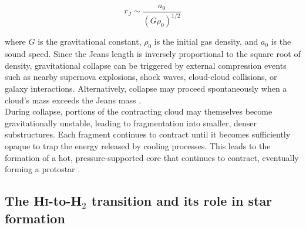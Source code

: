 \begin{equation}
    r_J \sim \frac{a_0}{(G\rho_0)^{1/2}}
\end{equation}

\noindent where $G$ is the gravitational constant, $\rho_0$ is the initial gas density, and $a_0$ is the sound speed. Since the Jeans length is inversely proportional to the square root of density, gravitational collapse can be triggered by external compression events such as nearby supernova explosions, shock waves, cloud-cloud collisions, or galaxy interactions. Alternatively, collapse may proceed spontaneously when a cloud's mass exceeds the Jeans mass \citep{Jeans1902, ISF2011}.\\\indent
During collapse, portions of the contracting cloud may themselves become gravitationally unstable, leading to fragmentation into smaller, denser substructures. Each fragment continues to contract until it becomes sufficiently opaque to trap the energy released by cooling processes. This leads to the formation of a hot, pressure-supported core that continues to contract, eventually forming a protostar \citep{ISF2011, Klessen2016}.

\subsection{The \textrm{H\textsc{i}}-to-H$_2$ transition and its role in star formation}

